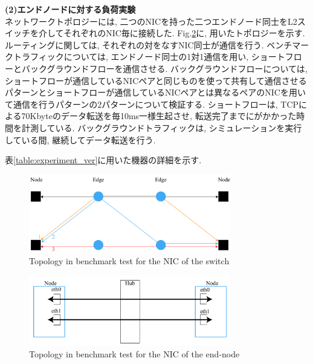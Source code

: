 {\bf (2)エンドノードに対する負荷実験}\\
ネットワークトポロジーには, 二つのNICを持った二つエンドノード同士をL2スイッチを介してそれぞれのNIC毎に接続した.
Fig.\ref{fig:topology_node}に, 用いたトポロジーを示す.
ルーティングに関しては, それぞれの対をなすNIC同士が通信を行う.
ベンチマークトラフィックについては, エンドノード同士の1対1通信を用い, ショートフローとバックグラウンドフローを通信させる.
バックグラウンドフローについては,
ショートフローが通信しているNICペアと同じものを使って共有して通信させるパターンとショートフローが通信しているNICペアとは異なるペアのNICを用いて通信を行うパターンの2パターンについて検証する.
ショートフローは, TCPによる70Kbyteのデータ転送を毎10ms一様生起させ, 転送完了までにがかかった時間を計測している.
バックグラウンドトラフィックは, シミュレーションを実行している間, 継続してデータ転送を行う.

表\ref{table:experiment_ver}に用いた機器の詳細を示す.
\begin{figure}[t]
    \begin{center}
    \includegraphics[autoebb, width=250pt]{./img/topology_ns3.pdf}
    \caption{Topology in benchmark test for the NIC of
    the switch}
    \label{fig:topology_switch}
    \end{center}
\end{figure}

\begin{figure}[t]
    \begin{center}
    \includegraphics[autoebb, width=250pt]{./img/topology_real.pdf}
    \caption{ Topology in benchmark test for the NIC of
    the end-node}
    \label{fig:topology_node}
    \end{center}
\end{figure}

